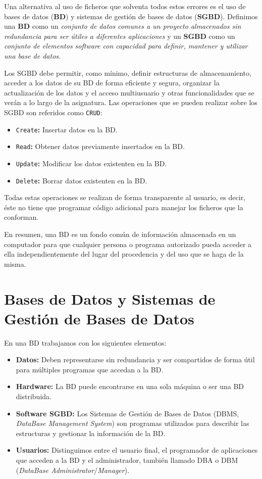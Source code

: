 Una alternativa al uso de ficheros que solventa todos estos errores es el uso de bases de datos (\textbf{BD}) y sistemas de gestión de bases de datos (\textbf{SGBD}).
Definimos una \textbf{BD} como un \textit{conjunto de datos comunes a un proyecto almacenados sin redundancia para ser útiles a diferentes aplicaciones} y un \textbf{SGBD} como un \textit{conjunto de elementos software con capacidad para definir, mantener y utilizar una base de datos}.

Los SGBD debe permitir, como mínimo, definir estructuras de almacenamiento, acceder a los datos de su BD de forma eficiente y segura, organizar la actualización de los datos y el acceso multiusuario y otras funcionalidades que se verán a lo largo de la asignatura. Las operaciones que se pueden realizar sobre los SGBD son referidos como \texttt{CRUD}:

\begin{itemize}
	\item\texttt{Create}\textbf{:} Insertar datos en la BD\@.
	\item\texttt{Read}\textbf{:} Obtener datos previamente insertados en la BD\@.
	\item\texttt{Update}\textbf{:} Modificar los datos existenten en la BD\@.
	\item\texttt{Delete}\textbf{:} Borrar datos existenten en la BD\@.
\end{itemize}

Todas estas operaciones se realizan de forma transparente al usuario, es decir, éste no tiene que programar código adicional para manejar los ficheros que la conforman.

En resumen, una BD es un fondo común de información almacenada en un computador para que cualquier persona o programa autorizado pueda acceder a ella independientemente del lugar del procedencia y del uso que se haga de la misma.

\section{Bases de Datos y Sistemas de Gestión de Bases de Datos}

En una BD trabajamos con los siguientes elementos:

\begin{itemize}
	\item\textbf{Datos:} Deben representarse sin redundancia y ser compartidos de forma útil para múltiples programas que accedan a la BD\@.
	\item\textbf{Hardware:} La BD puede encontrarse en una sola máquina o ser una BD distribuida.
	\item\textbf{Software SGBD:} Los Sistemas de Gestión de Bases de Datos (DBMS, \textit{DataBase Management System}) son programas utilizados para describir las estructuras y gestionar la información de la BD\@.
	\item\textbf{Usuarios:} Distinguimos entre el usuario final, el programador de aplicaciones que acceden a la BD y el administrador, también llamado DBA o DBM (\textit{DataBase Administrator}/\textit{Manager}).
\end{itemize}

